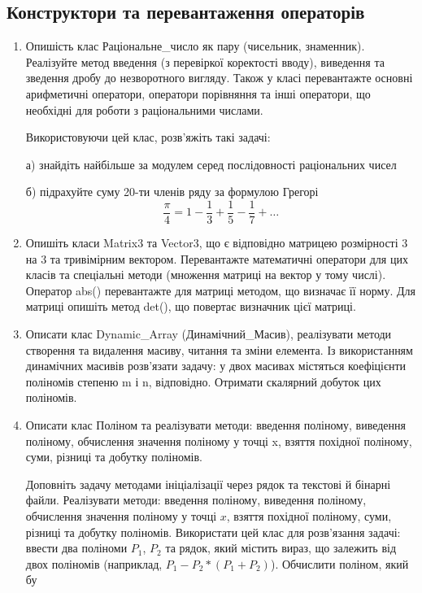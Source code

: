 \documentclass[]{article}
\begin{document}
\subsection{ Конструктори та перевантаження операторів}
\begin{enumerate}
\item
Опишість клас Раціональне\_число
як пару (чисельник, знаменник). Реалізуйте метод введення (з перевіркої
коректості вводу), виведення та зведення дробу до незворотного вигляду.
Також у класі перевантажте основні арифметичні оператори, оператори
порівняння та інші оператори, що необхідні для роботи з раціональними
числами.

Використовуючи цей клас, розв'яжіть такі задачі:

а) знайдіть найбільше за модулем серед послідовності раціональних чисел

б) підрахуйте суму 20-ти членів ряду за формулою Грегорі
\[\frac{\pi}{4} = 1 - \frac{1}{3} + \frac{1}{5} - \frac{1}{7} + \ldots\]

\item
Опишіть класи Matrix3 та Vector3,
що є відповідно матрицею розмірності 3 на 3 та тривімірним вектором.
Перевантажте математичні оператори для цих класів та спеціальні методи
(множення матриці на вектор у тому числі). Оператор abs() перевантажте
для матриці методом, що визначає її норму. Для матриці опишіть метод
det(), що повертає визначник цієї матриці.
\item
Описати клас Dynamic\_Array (Динамічний\_Масив), реалізувати методи
створення та видалення масиву, читання та зміни елемента. Із
використанням динамічних масивів розв'язати задачу: у двох масивах
містяться коефіцієнти поліномів степеню m і n, відповідно. Отримати
скалярний добуток цих поліномів.
\item
Описати клас Поліном та реалізувати методи: введення поліному, виведення
поліному, обчислення значення поліному у точці x, взяття похідної
поліному, суми, різниці та добутку поліномів.

Доповніть задачу методами ініціалізації через рядок та текстові й
бінарні файли. Реалізувати методи: введення поліному, виведення
поліному, обчислення значення поліному у точці \(x\), взяття похідної
поліному, суми, різниці та добутку поліномів. Використати цей клас для
розв'язання задачі: ввести два поліноми \(P_{1}\), \(P_{2}\) та рядок,
який містить вираз, що залежить від двох поліномів (наприклад,
\(P_{1} - P_{2}*(P_{1} + P_{2})\)). Обчислити поліном, який бу

\end{enumerate}
\end{document}
